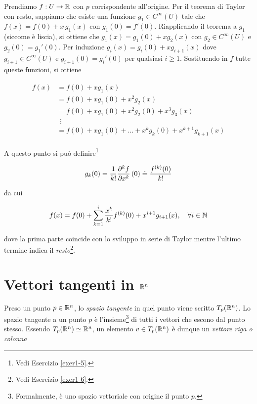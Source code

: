 Prendiamo $ f : U \to \mathbb{R} $ con $ p $ corrispondente all'origine. Per il teorema di Taylor con resto, sappiamo che esiste una funzione $ g_{1} \in C^{\infty}(U) $ tale che $ f(x) = f(0) + x \, g_{1}(x) $ con $ g_{1}(0) = f'(0) $. Riapplicando il teorema a $ g_{1} $ (siccome è liscia), si ottiene che $ g_{1}(x) = g_{1}(0) + x g_{2}(x) $ con $ g_{2} \in C^{\infty}(U) $ e $ g_{2}(0) = g_{1}'(0) $. Per induzione $ g_{i}(x) = g_{i}(0) + x g_{i+1}(x) $ dove $ g_{i+1} \in C^{\infty} (U) $ e $ g_{i+1}(0) = g_{i}'(0) $ per qualsiasi $ i \geqslant 1 $. Sostituendo in $ f $ tutte queste funzioni, si ottiene

\begin{align}
	\begin{split}
			f(x) &= f(0) + x g_{1}(x) \\
			&= f(0) + x g_{1}(0) + x^{2} g_{2}(x) \\
			&= f(0) + x g_{1}(0) + x^{2} g_{2}(0) + x^{3} g_{3}(x) \\
			& \;\, \vdots \\
			&= f(0) + x g_{1}(0) + \dots + x^{k} g_{k}(0) + x^{k+1} g_{k+1}(x)
	\end{split}
\end{align}

A questo punto si può definire\footnote{%
	Vedi Esercizio \ref{exer1-5}.}

\begin{equation}
	g_{k}(0) = \dfrac{1}{k!} \pdv[k]{f}{x} \, (0) \doteq \dfrac{f^{(k)}(0)}{k!}
\end{equation}

da cui

\begin{equation}
	f(x) = f(0) + \sum_{k=1}^{i} \dfrac{x^{k}}{k!} f^{(k)} (0) + x^{i+1} g_{i+1}(x) \qcomma \forall i \in \N
\end{equation}

dove la prima parte coincide con lo sviluppo in serie di Taylor mentre l'ultimo termine indica il \textit{resto}\footnote{%
	Vedi Esercizio \ref{exer1-6}.}.

\section{Vettori tangenti in $ \mathbb{R}^{n} $}

Preso un punto $ p \in \mathbb{R}^{n} $, lo \textit{spazio tangente} in quel punto viene scritto $ T_{p}(\mathbb{R}^{n}) $. Lo spazio tangente a un punto $ p $ è l'insieme\footnote{%
	Formalmente, è uno spazio vettoriale con origine il punto $ p $.%
} di tutti i vettori che escono dal punto stesso. Essendo $ T_{p}(\mathbb{R}^{n}) \simeq \mathbb{R}^{n} $, un elemento $ v \in T_{p}(\mathbb{R}^{n}) $ è dunque un \textit{vettore riga o colonna}

